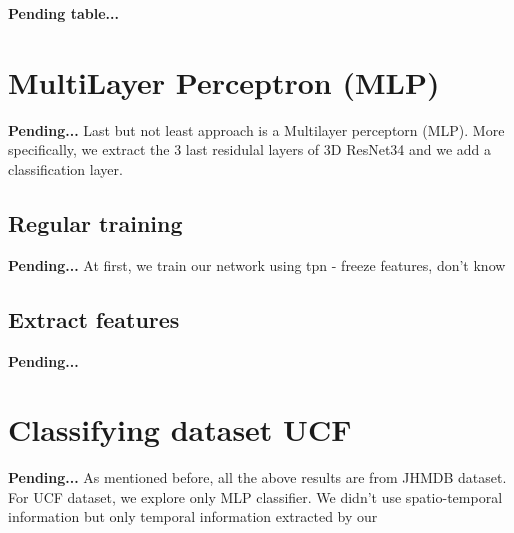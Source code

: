 \textbf{Pending table...}





\section{MultiLayer Perceptron (MLP)}
\textbf{Pending...}
Last but not least approach is a Multilayer perceptorn (MLP). More specifically, we extract the 3 last residulal layers of 3D ResNet34
and we add a classification layer. 

\subsection{Regular training}
\textbf{Pending...}
At first, we train our network using 
tpn - freeze features, don't know



\subsection{Extract features}
\textbf{Pending...}



\section{Classifying dataset UCF}
\textbf{Pending...}
As mentioned before, all the above results are from JHMDB dataset. For UCF dataset, we explore only MLP classifier. We didn't use spatio-temporal
information but only temporal information extracted by our


